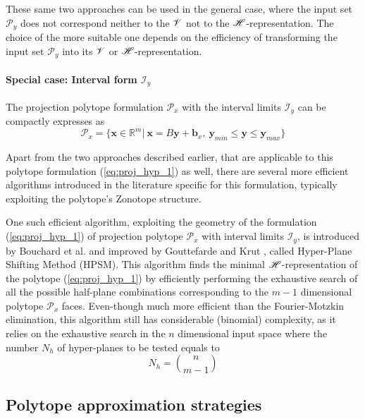 These same two approaches can be used in the general case, where the input set $\mathcal{P}_y$ does not correspond neither to the $\mathscr{V}$ not to the $\mathscr{H}$-representation. The choice of the more suitable one depends on the efficiency of transforming the input set $\mathcal{P}_y$ into its $\mathscr{V}$ or $\mathscr{H}$-representation. 


\paragraph*{Special case: Interval form $\mathcal{I}_y$} 

The projection polytope formulation $\mathcal{P}_x$ with the interval limits $\mathcal{I}_y$ can be compactly expresses as
\begin{equation}
    \mathcal{P}_x=\{\bm{x}\in\mathbb{R}^m |~ \bm{x} = B\bm{y} + \bm{b}_x,~\bm{y}_{min} \leq  \bm{y} \leq \bm{y}_{max}  \}
    \label{eq:proj_hyp_1}
\end{equation}

Apart from the two approaches described earlier, that are applicable to this polytope formulation (\ref{eq:proj_hyp_1}) as well, there are several more efficient algorithms introduced in the literature specific for this formulation, typically exploiting the polytope's Zonotope structure.

One such  efficient algorithm, exploiting the geometry of the formulation (\ref{eq:proj_hyp_1}) of projection polytope $\mathcal{P}_x$ with interval limits $\mathcal{I}_y$, is introduced by Bouchard et al. \cite{Bouchard2009} and improved by Gouttefarde and Krut \cite{hyper_psm}, called Hyper-Plane Shifting Method (HPSM). This algorithm finds the minimal $\mathscr{H}$-representation of the polytope (\ref{eq:proj_hyp_1}) by efficiently performing the exhaustive search of all the possible half-plane combinations corresponding to the $m-1$ dimensional polytope $\mathcal{P}_x$ faces. Even-though much more efficient than the Fourier-Motzkin elimination, this algorithm still has considerable (binomial) complexity, as it relies on the exhaustive search in the $n$ dimensional input space where the number $N_h$ of hyper-planes to be tested equals to 
$$N_h = \binom{n}{m-1}$$

\subsection{Polytope approximation strategies}
\label{ch:approximation_algos}
 
